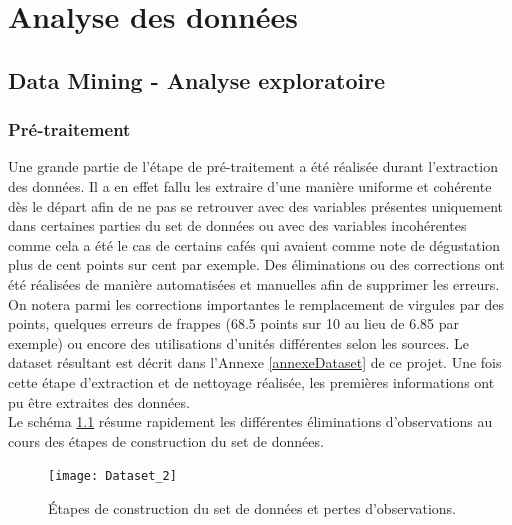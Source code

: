 
\chapter{Analyse des données}
\minitoc

\newpage
\section{Data Mining - Analyse exploratoire}
\subsection{Pré-traitement}



Une grande partie de l'étape de pré-traitement a été réalisée durant l'extraction des données. Il a en effet fallu les extraire d'une manière uniforme et cohérente dès le départ afin de ne pas se retrouver avec des variables présentes uniquement dans certaines parties du set de données ou avec des variables incohérentes comme cela a été le cas de certains cafés qui avaient comme note de dégustation plus de cent points sur cent par exemple. Des éliminations ou des corrections ont été réalisées de manière automatisées et manuelles afin de supprimer les erreurs. On notera parmi les corrections importantes le remplacement de virgules par des points, quelques erreurs de frappes (68.5 points sur 10 au lieu de 6.85 par exemple) ou encore des utilisations d'unités différentes selon les sources. Le dataset résultant est décrit dans l'Annexe \ref{annexeDataset} de ce projet. Une fois cette étape d'extraction et de nettoyage réalisée, les premières informations ont pu être extraites des données.\\


\noindent Le schéma \ref{DatasetMaking} résume rapidement les différentes éliminations d'observations au cours des étapes de construction du set de données. 

\begin{figure}[H]
	\texttt{[image: Dataset\_2]}
	\caption{\label{DatasetMaking} Étapes de construction du set de données et pertes d'observations.}
\end{figure}



